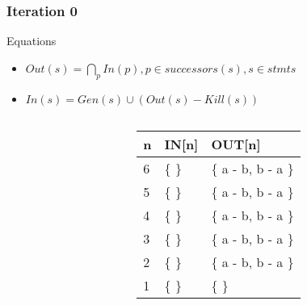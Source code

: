 \begin{frame}[fragile, t]
	\frametitle{Iteration 0} 
	
	\begin{center}
		\begin{scriptsize}
			\begin{minipage}{8cm}
				\begin{block}{Equations}
					\begin{itemize}
						\item $Out(s) = \bigcap_p In(p), p \in successors(s), s \in stmts$
						\item $In(s) = Gen(s) \cup (Out(s) - Kill(s))$  
					\end{itemize}
				\end{block}
			\end{minipage}
		\end{scriptsize}
	\end{center}
	
	\begin{columns}[T]
		\begin{column}[T]{.5\textwidth}
			\vspace{0pt}
			
		\end{column}
		\begin{column}[T]{.5\textwidth}
			\vspace{30pt}    
			\begin{scriptsize}
				\begin{table}[]
					\begin{tabular}{|l|l|l|}
						\hline
						n & IN{[}n{]} & OUT{[}n{]} \\ \hline
						6  & \{ \} & \{ a - b, b - a \}  \\ \hline
						5  & \{ \} & \{ a - b, b - a \}  \\ \hline
						4  & \{ \} & \{ a - b, b - a \}  \\ \hline
						3  & \{ \} & \{ a - b, b - a \}  \\ \hline
						2  & \{ \} & \{ a - b, b - a \} \\ \hline
						1  & \{ \} & \{ \} \\ \hline
					\end{tabular}
				\end{table}   
			\end{scriptsize}
		\end{column}
		
	\end{columns}
	
\end{frame}





